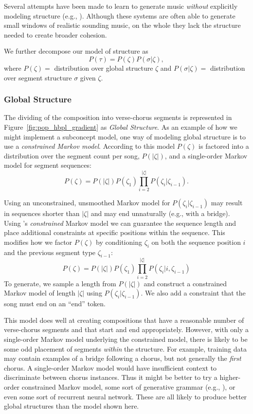 \documentclass[letterpaper]{article}
\begin{document}
Several attempts have been made to learn to generate music \emph{without} explicitly modeling structure (e.g., \cite{van2016wavenet}). Although these systems are often able to generate small windows of realistic sounding music, on the whole they lack the structure needed to create broader cohesion.

We further decompose our model of structure as
\[ P(\tau) = P(\zeta)P(\sigma|\zeta), \]
\noindent where \(P(\zeta)=\) distribution over global structure $\zeta$ and \(P(\sigma|\zeta)=\) distribution over segment structure $\sigma$ given $\zeta$.

\subsubsection{Global Structure}
The dividing of the composition into verse-chorus segments is represented in Figure~\ref{fig:pop_hbpl_gradient} as \emph{Global Structure}. As an example of how we might implement a subconcept model, one way of modeling global structure is to use a \textit{constrained Markov model}. According to this model $P(\zeta)$ is factored into a distribution over the segment count per song, $P(|\zeta|)$, and a single-order Markov model for segment sequences:
\[ P(\zeta) = P(|\zeta|) P(\zeta_1) \prod_{i=2}^{|\zeta|} P(\zeta_i|\zeta_{i-1}). \]

Using an unconstrained, unsmoothed Markov model for $P(\zeta_i|\zeta_{i-1})$ may result in sequences shorter than $|\zeta|$ and may end unnaturally (e.g., with a bridge). Using \citeauthor{pachet2001finite}'s \emph{constrained} Markov model we can guarantee the sequence length and place additional constraints at specific positions within the sequence. This modifies how we factor $P(\zeta)$ by conditioning $\zeta_i$ on both the sequence position $i$ and the previous segment type $\zeta_{i-1}$:
\[ P(\zeta) = P(|\zeta|) P(\zeta_1) \prod_{i=2}^{|\zeta|} P(\zeta_i|i,\zeta_{i-1}) \]
To generate, we sample a length from $P(|\zeta|)$ and construct a constrained Markov model of length $|\zeta|$ using $P(\zeta_i|\zeta_{i-1})$. We also add a constraint that the song must end on an ``end'' token. 

This model does well at creating compositions that have a reasonable number of verse-chorus segments and that start and end appropriately. However, with only a single-order Markov model underlying the constrained model, there is likely to be some odd placement of segments \emph{within} the structure. For example, training data may contain examples of a bridge following a chorus, but not generally the \emph{first} chorus. A single-order Markov model would have insufficient context to discriminate between chorus instances. Thus it might be better to try a higher-order constrained Markov model, some sort of generative grammar (e.g., \cite{steedman1984generative}), or even some sort of recurrent neural network. These are all likely to produce better global structures than the model shown here.
\end{document}
